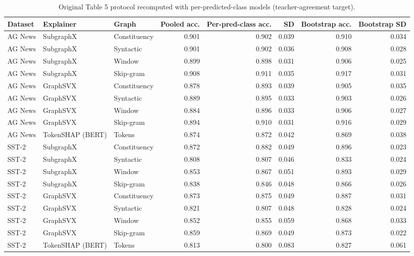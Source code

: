\begin{table}[H]
\centering
\small
\caption{Original Table 5 protocol recomputed with per-predicted-class models (teacher-agreement target).}
\label{tab:lr_paper_protocol}
\begin{tabular}{lllrrrrr}
\toprule
Dataset & Explainer & Graph & Pooled acc. & Per-pred-class acc. & SD & Bootstrap acc. & Bootstrap SD \\
\midrule
AG News & SubgraphX & Constituency & 0.901 & 0.902 & 0.039 & 0.910 & 0.034 \\
AG News & SubgraphX & Syntactic & 0.901 & 0.902 & 0.036 & 0.908 & 0.028 \\
AG News & SubgraphX & Window & 0.899 & 0.898 & 0.031 & 0.906 & 0.025 \\
AG News & SubgraphX & Skip-gram & 0.908 & 0.911 & 0.035 & 0.917 & 0.031 \\
AG News & GraphSVX & Constituency & 0.878 & 0.893 & 0.039 & 0.905 & 0.035 \\
AG News & GraphSVX & Syntactic & 0.889 & 0.895 & 0.033 & 0.903 & 0.026 \\
AG News & GraphSVX & Window & 0.884 & 0.896 & 0.033 & 0.906 & 0.027 \\
AG News & GraphSVX & Skip-gram & 0.894 & 0.910 & 0.031 & 0.916 & 0.029 \\
AG News & TokenSHAP (BERT) & Tokens & 0.874 & 0.872 & 0.042 & 0.869 & 0.038 \\
SST-2 & SubgraphX & Constituency & 0.872 & 0.882 & 0.049 & 0.896 & 0.023 \\
SST-2 & SubgraphX & Syntactic & 0.808 & 0.807 & 0.046 & 0.833 & 0.024 \\
SST-2 & SubgraphX & Window & 0.853 & 0.867 & 0.051 & 0.893 & 0.029 \\
SST-2 & SubgraphX & Skip-gram & 0.838 & 0.846 & 0.048 & 0.866 & 0.026 \\
SST-2 & GraphSVX & Constituency & 0.873 & 0.875 & 0.049 & 0.887 & 0.031 \\
SST-2 & GraphSVX & Syntactic & 0.821 & 0.807 & 0.048 & 0.828 & 0.024 \\
SST-2 & GraphSVX & Window & 0.852 & 0.855 & 0.059 & 0.868 & 0.033 \\
SST-2 & GraphSVX & Skip-gram & 0.859 & 0.869 & 0.049 & 0.873 & 0.022 \\
SST-2 & TokenSHAP (BERT) & Tokens & 0.813 & 0.800 & 0.083 & 0.827 & 0.061 \\
\bottomrule
\end{tabular}
\end{table}

